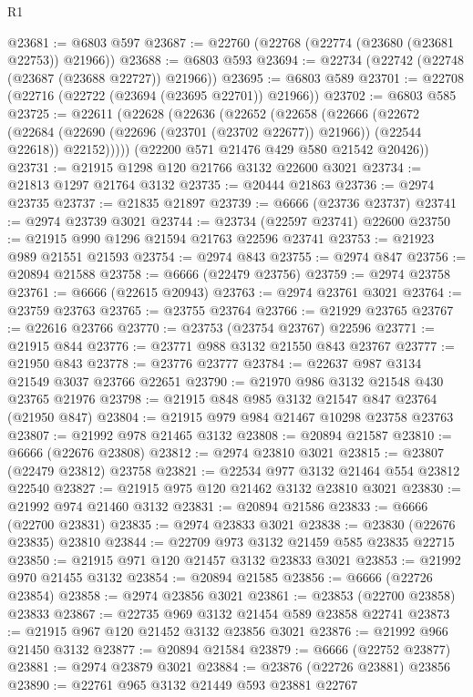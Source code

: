 \begin{lexlean}{R1}
\begin{coremodule}
@23681 := @6803 @597
@23687 := @22760 (@22768 (@22774 (@23680 (@23681 @22753)) @21966))
@23688 := @6803 @593
@23694 := @22734 (@22742 (@22748 (@23687 (@23688 @22727)) @21966))
@23695 := @6803 @589
@23701 := @22708 (@22716 (@22722 (@23694 (@23695 @22701)) @21966))
@23702 := @6803 @585
@23725 := @22611
    (@22628
      (@22636
        (@22652
          (@22658
            (@22666
              (@22672
                (@22684 (@22690 (@22696 (@23701 (@23702 @22677)) @21966)) (@22544 @22618))
                @22152)))))
      (@22200 @571 @21476 @429 @580 @21542 @20426))
@23731 := @21915 @1298 @120 @21766 @3132 @22600 @3021
@23734 := @21813 @1297 @21764 @3132
@23735 := @20444 @21863
@23736 := @2974 @23735
@23737 := @21835 @21897
@23739 := @6666 (@23736 @23737)
@23741 := @2974 @23739 @3021
@23744 := @23734 (@22597 @23741) @22600
@23750 := @21915 @990 @1296 @21594 @21763 @22596 @23741
@23753 := @21923 @989 @21551 @21593
@23754 := @2974 @843
@23755 := @2974 @847
@23756 := @20894 @21588
@23758 := @6666 (@22479 @23756)
@23759 := @2974 @23758
@23761 := @6666 (@22615 @20943)
@23763 := @2974 @23761 @3021
@23764 := @23759 @23763
@23765 := @23755 @23764
@23766 := @21929 @23765
@23767 := @22616 @23766
@23770 := @23753 (@23754 @23767) @22596
@23771 := @21915 @844
@23776 := @23771 @988 @3132 @21550 @843 @23767
@23777 := @21950 @843
@23778 := @23776 @23777
@23784 := @22637 @987 @3134 @21549 @3037 @23766 @22651
@23790 := @21970 @986 @3132 @21548 @430 @23765 @21976
@23798 := @21915 @848 @985 @3132 @21547 @847 @23764 (@21950 @847)
@23804 := @21915 @979 @984 @21467 @10298 @23758 @23763
@23807 := @21992 @978 @21465 @3132
@23808 := @20894 @21587
@23810 := @6666 (@22676 @23808)
@23812 := @2974 @23810 @3021
@23815 := @23807 (@22479 @23812) @23758
@23821 := @22534 @977 @3132 @21464 @554 @23812 @22540
@23827 := @21915 @975 @120 @21462 @3132 @23810 @3021
@23830 := @21992 @974 @21460 @3132
@23831 := @20894 @21586
@23833 := @6666 (@22700 @23831)
@23835 := @2974 @23833 @3021
@23838 := @23830 (@22676 @23835) @23810
@23844 := @22709 @973 @3132 @21459 @585 @23835 @22715
@23850 := @21915 @971 @120 @21457 @3132 @23833 @3021
@23853 := @21992 @970 @21455 @3132
@23854 := @20894 @21585
@23856 := @6666 (@22726 @23854)
@23858 := @2974 @23856 @3021
@23861 := @23853 (@22700 @23858) @23833
@23867 := @22735 @969 @3132 @21454 @589 @23858 @22741
@23873 := @21915 @967 @120 @21452 @3132 @23856 @3021
@23876 := @21992 @966 @21450 @3132
@23877 := @20894 @21584
@23879 := @6666 (@22752 @23877)
@23881 := @2974 @23879 @3021
@23884 := @23876 (@22726 @23881) @23856
@23890 := @22761 @965 @3132 @21449 @593 @23881 @22767

\end{coremodule}
\end{lexlean}
